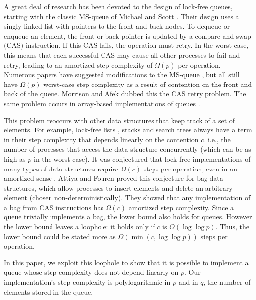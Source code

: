 \documentclass[acmsmall,nonacm,anonymous]{acmart}
\begin{document}
A great deal of research has been devoted to the design of lock-free queues,
starting with the classic MS-queue of Michael and Scott \cite{DBLP:conf/podc/MichaelS96}.
Their design uses a singly-linked list with pointers to the front and back nodes.
To dequeue or enqueue an element, the front or back pointer is updated by a 
compare-and-swap (CAS) instruction.
If this CAS fails, the operation must retry.
In the worst case, this means that each successful CAS may cause all other processes to
fail and retry, leading to an amortized step complexity of $\Omega(p)$ per operation.
Numerous papers have suggested modifications to the MS-queue \cite{list some}, but 
all still have $\Omega(p)$ worst-case step complexity as a result of
contention on the front and back of the queue.
Morrison and Afek \cite{DBLP:conf/ppopp/MorrisonA13} dubbed this the CAS retry problem.
The same problem occurs in array-based implementations of queues \cite{list some}.

This problem reoccurs with other data structures that keep track of a set of elements.
For example, lock-free lists \cite{}, stacks \cite{} and search trees \cite{} 
always have a term in their step complexity
that depends linearly on the contention $c$, i.e., 
the number of processes that access the data structure concurrently (which can be as high
as $p$ in the worst case).
It was conjectured that lock-free implementations of many types of data structures
require $\Omega(c)$ steps per operation, even in an amortized sense \cite{Ruppert}.
Attiya and Fouren \cite{AF} proved this conjecture for bag data structures, which allow processes
to insert elements and delete an arbitrary element (chosen non-deterministically).
They showed that any implementation of a bag from CAS instructions
has $\Omega(c)$ amortized step complexity.
Since a queue trivially implements a bag, the lower bound also holds for queues.
However the lower bound leaves a loophole:  it holds only if $c$ is $O(\log\log p)$.
Thus, the lower bound could be stated more as $\Omega(\min(c,\log\log p))$ steps per operation.

In this paper, we exploit this loophole to show that it is possible to implement a queue
whose step complexity does not depend linearly on $p$.
Our implementation's step complexity is polylogarithmic in $p$ and in $q$, the number of elements
stored in the queue.
\end{document}
